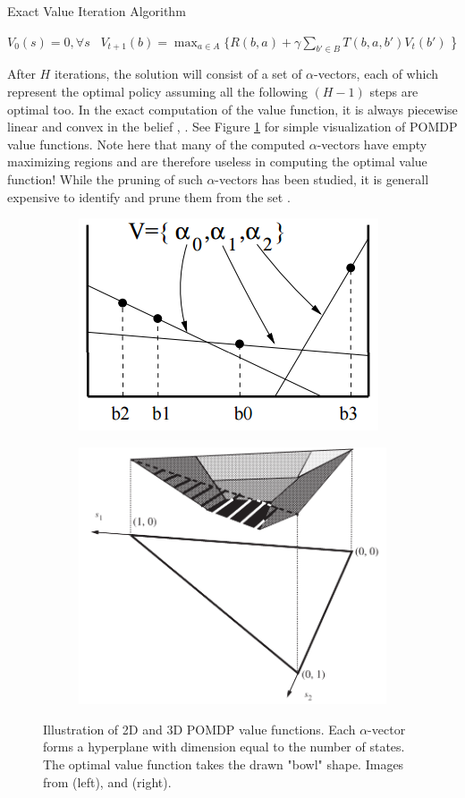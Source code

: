 \documentclass[12pt]{elsarticle}
\begin{document}
\begin{algorithm}
\label{alg:VI_alg}
\begin{algorithmic}[1]
\caption{Exact Value Iteration Algorithm}
\State $V_0(s) = 0, \forall s$
    \State~$V_{t+1}(b) = \max_{a \in A} \{ R(b,a) + \gamma \sum_{b' \in B} T(b,a,b')V_{t}(b')$ \}
    \EndFor
\EndFor
\end{algorithmic}
\end{algorithm}

After $H$ iterations, the solution will consist of a set of $\alpha$-vectors, each of which represent the optimal policy assuming all the following $(H-1)$ steps are optimal too. In the exact computation of the value function, it is always piecewise linear and convex in the belief \cite{kaelbling1998planning}, \cite{pineau2003point}. See Figure \ref{fig:pbvi_convex} for simple visualization of POMDP value functions. Note here that many of the computed $\alpha$-vectors have empty maximizing regions and are therefore useless in computing the optimal value function! While the pruning of such $\alpha$-vectors has been studied, it is generall expensive to identify and prune them from the set \cite{spaan2005perseus}. 

\begin{figure}[h!]
\centering 
\begin{subfigure}
    \centering 
    \includegraphics[width=0.4\columnwidth]{pbvi_convex.PNG}
    \centering
\end{subfigure}%
\begin{subfigure}
    \centering 
    \includegraphics[width=0.4\columnwidth]{pbvi_convex3D.PNG}
    \centering
\end{subfigure}%
\caption{Illustration of 2D and 3D POMDP value functions. Each $\alpha$-vector forms a hyperplane with dimension equal to the number of states. The optimal value function takes the drawn "bowl" shape. Images from \cite{pineau2003point} (left), and \cite{kaelbling1998planning} (right).}
\label{fig:pbvi_convex}
\end{figure}
\end{document}
